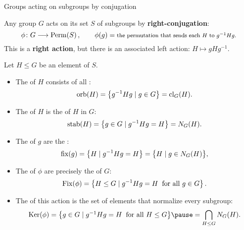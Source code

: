 \documentclass[8pt]{beamer}
\newcommand{\Pause}{\pause}      %
\begin{document}

\begin{frame}{Groups acting on subgroups by conjugation} \smallskip
  
  Any group $G$ acts on its set $S$ of subgroups by
  \textbf{right-conjugation}:
  \[
  \phi\colon G\longrightarrow\operatorname{Perm}(S)\,,\qquad
  \phi(g)=\mbox{\footnotesize the permutation that sends each $H$ to
    $g^{-1}Hg$.}
  \]
  \Pause This is a \textbf{right action}, but there is an associated left
  action: $H\mapsto gHg^{-1}$.
  
  \medskip\Pause

  Let $H\leq G$ be an element of $S$. \smallskip\Pause
  \begin{itemize}
  \item The  of $H$ consists of all : %
    \[
    \operatorname{orb}(H)=\big\{g^{-1}Hg\mid g\in G\big\}=\operatorname{cl}_G(H).
    \]
    \vspace{-4mm}\Pause
  \item The  of $H$ is the
     of $H$ in $G$: 
    \[
    \operatorname{stab}(H)=\big\{g\in G\mid g^{-1}Hg=H\big\}=N_G(H).
    \]
    \vspace{-4mm}\Pause
  \item The  of $g$ are the
    :
    \[
    \operatorname{fix}(g)=\big\{H\mid g^{-1}Hg=H\big\}=\big\{H\mid g\in N_G(H)\big\},
    \]
    \vspace{-4mm}\Pause
  \item The  of $\phi$ are precisely the
     of $G$: %
    \[
    \operatorname{Fix}(\phi)=\big\{H\leq G\mid g^{-1}Hg=H\;\;\text{for all }g\in G\big\}\,.
    \]
    \vspace{-4mm}\Pause
  \item The  of this action is the set of elements that
    normalize every subgroup:
    \[
    \begin{array}{c@{\hspace{1mm}}c@{\hspace{1mm}}l}
      \Ker(\phi)
      &=&\big\{g\in G\mid g^{-1}Hg=H\;\;\text{for all }H\leq G\big\}
      \Pause=\displaystyle\bigcap_{H\leq G} N_G(H).
    \end{array}
    \]
  \end{itemize}
  
\end{frame}
\end{document}
